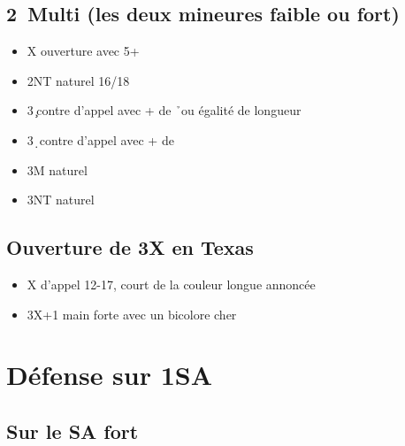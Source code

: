 \documentclass[a4paper]{article}
\begin{document}
\subsection{2\pdfs\ Multi (les deux mineures faible ou fort)}

\begin{itemize}
\item X ouverture avec 5+\s\ 

\item 2NT naturel 16/18

\item 3\c\ contre d'appel avec + de \h\ ou égalité de longueur

\item 3\d\ contre d'appel avec + de \s\ 

\item 3M naturel

\item 3NT naturel

\end{itemize}

\subsection{Ouverture de 3X en Texas}

\begin{itemize}
\item X d'appel 12-17, court de la couleur longue annoncée

\item 3X+1 main forte avec un bicolore cher

\end{itemize}

\section{Défense sur 1SA}

\subsection{Sur le SA fort}
\end{document}
